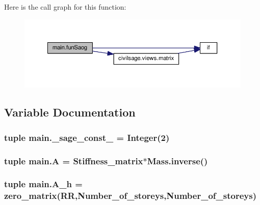 Here is the call graph for this function\+:
\nopagebreak
\begin{figure}[H]
\begin{center}
\leavevmode
\includegraphics[width=350pt]{namespacemain_a4f60afd2426ee9409955e4352b3f0486_cgraph}
\end{center}
\end{figure}




\subsection{Variable Documentation}
\hypertarget{namespacemain_ad85d7913c0e40b9e1f30e64611a0fafa}{}
\subsubsection[{\+\_\+sage\+\_\+const\+\_\+2}]{\setlength{\rightskip}{0pt plus 5cm}tuple main.\+\_\+sage\+\_\+const\+\_ = Integer(2)}\label{namespacemain_ad85d7913c0e40b9e1f30e64611a0fafa}
\hypertarget{namespacemain_ad101f166a53497f04b37636bcadbfe65}{}
\subsubsection[{A}]{\setlength{\rightskip}{0pt plus 5cm}tuple main.\+A = {\bf Stiffness\+\_\+matrix}$\ast$Mass.\+inverse()}\label{namespacemain_ad101f166a53497f04b37636bcadbfe65}
\hypertarget{namespacemain_a90e3156cc1a3ea63ba2d089e78b34e3d}{}
\subsubsection[{A\+\_\+h}]{\setlength{\rightskip}{0pt plus 5cm}tuple main.\+A\+\_\+h = zero\+\_\+matrix(R\+R,Number\+\_\+of\+\_\+storeys,Number\+\_\+of\+\_\+storeys)}\label{namespacemain_a90e3156cc1a3ea63ba2d089e78b34e3d}
\hypertarget{namespacemain_a6ae8768d11174f5baf9febc5244d6f06}{}
